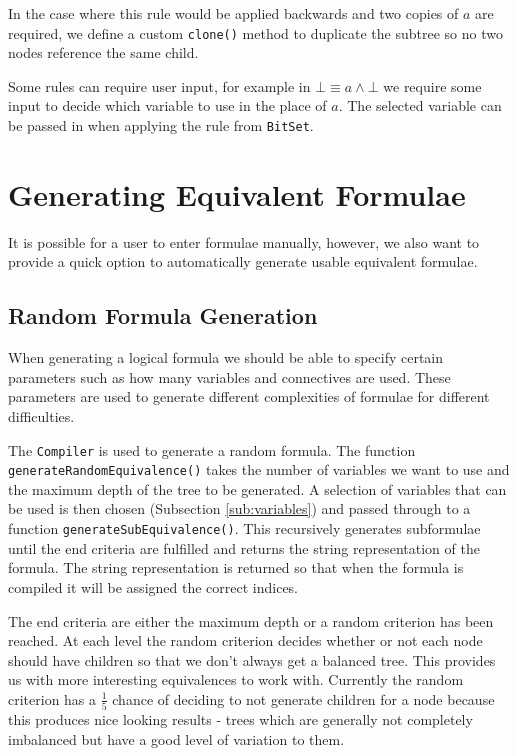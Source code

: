 \documentclass{report}
\begin{document}
In the case where this rule would be applied backwards and two copies of $a$ are required, we define a custom {\tt clone()} method to duplicate the subtree so no two nodes reference the same child.

Some rules can require user input, for example in $\bot \equiv a \land\bot$ we require some input to decide which variable to use in the place of $a$. The selected variable can be passed in when applying the rule from {\tt BitSet}.

\section{Generating Equivalent Formulae}
\label{sec:generating_equivalent_formulae}

It is possible for a user to enter formulae manually, however, we also want to provide a quick option to automatically generate usable equivalent formulae.

\subsection{Random Formula Generation}
\label{sub:random_formula_generation}

When generating a logical formula we should be able to specify certain parameters such as how many variables and connectives are used. These parameters are used to generate different complexities of formulae for different difficulties.

The {\tt Compiler} is used to generate a random formula. The function {\tt generateRandomEquivalence()} takes the number of variables we want to use and the maximum depth of the tree to be generated. A selection of variables that can be used is then chosen (Subsection \ref{sub:variables}) and passed through to a function {\tt generateSubEquivalence()}. This recursively generates subformulae until the end criteria are fulfilled and returns the string representation of the formula. The string representation is returned so that when the formula is compiled it will be assigned the correct indices.

The end criteria are either the maximum depth or a random criterion has been reached. At each level the random criterion decides whether or not each node should have children so that we don't always get a balanced tree. This provides us with more interesting equivalences to work with. Currently the random criterion has a $\frac{1}{5}$ chance of deciding to not generate children for a node because this produces nice looking results - trees which are generally not completely imbalanced but have a good level of variation to them. 
\end{document}
